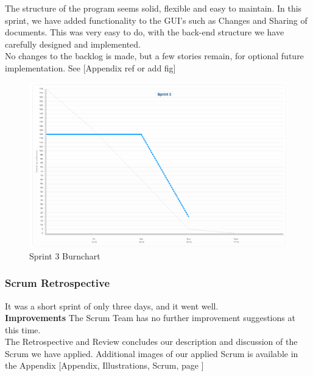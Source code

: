 The structure of the program seems solid, flexible and easy to maintain. In this sprint, we have added functionality to the GUI's such as Changes and Sharing of documents. This was very easy to do, with the back-end structure we have carefully designed and implemented.\\
\newline
No changes to the backlog is made, but a few stories remain, for optional future implementation. See [Appendix ref or add fig]
\begin{figure}[H]
  \includegraphics[width=\textwidth]{illustrations/sprint3burn.PNG}
  \caption{Sprint 3 Burnchart}
  \label{sprint3burnchart}
\end{figure}
\subsubsection{Scrum Retrospective}
It was a short sprint of only three days, and it went well.\\
\newline
\textbf{Improvements}
The Scrum Team has no further improvement suggestions at this time.\\
\newline
The Retrospective and Review concludes our description and discussion of the Scrum we have applied. Additional images of our applied Scrum is available in the Appendix [Appendix, Illustrations, Scrum, page \pageref{scrumillustrations}]
\newpage